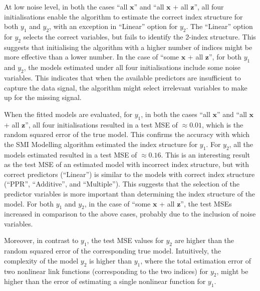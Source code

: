 \documentclass[11pt,a4paper,]{article}
\begin{document}
At low noise level, in both the cases ``all \(\bm{x}\)'' and ``all
\(\bm{x}\) + all \(\bm{z}\)'', all four initialisations enable the
algorithm to estimate the correct index structure for both \(y_{1}\) and
\(y_{2}\), with an exception in ``Linear'' option for \(y_{2}\). The
``Linear'' option for \(y_{2}\) selects the correct variables, but fails
to identify the 2-index structure. This suggests that initialising the
algorithm with a higher number of indices might be more effective than a
lower number. In the case of ``some \(\bm{x}\) + all \(\bm{z}\)'', for
both \(y_{1}\) and \(y_{2}\), the models estimated under all four
initialisations include some noise variables. This indicates that when
the available predictors are insufficient to capture the data signal,
the algorithm might select irrelevant variables to make up for the
missing signal.

When the fitted models are evaluated, for \(y_{1}\), in both the cases
``all \(\bm{x}\)'' and ``all \(\bm{x}\) + all \(\bm{z}\)'', all four
initialisations resulted in a test MSE of \(\approx 0.01\), which is the
random squared error of the true model. This confirms the accuracy with
which the SMI Modelling algorithm estimated the index structure for
\(y_{1}\). For \(y_{2}\), all the models estimated resulted in a test
MSE of \(\approx 0.16\). This is an interesting result as the test MSE
of an estimated model with incorrect index structure, but with correct
predictors (``Linear'') is similar to the models with correct index
structure (``PPR'', ``Additive'', and ``Multiple''). This suggests that
the selection of the predictor variables is more important than
determining the index structure of the model. For both \(y_{1}\) and
\(y_{2}\), in the case of ``some \(\bm{x}\) + all \(\bm{z}\)'', the test
MSEs increased in comparison to the above cases, probably due to the
inclusion of noise variables.

Moreover, in contrast to \(y_{1}\), the test MSE values for \(y_{2}\)
are higher than the random squared error of the corresponding true
model. Intuitively, the complexity of the model \(y_{2}\) is higher than
\(y_{1}\), where the total estimation error of two nonlinear link
functions (corresponding to the two indices) for \(y_{2}\), might be
higher than the error of estimating a single nonlinear function for
\(y_{1}\).
\end{document}
